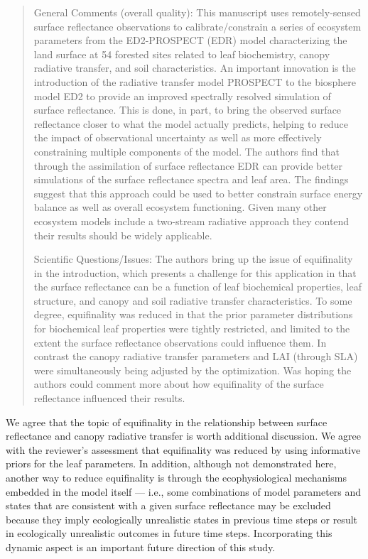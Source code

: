 \begin{quote}
  General Comments (overall quality): This manuscript uses remotely-sensed surface reflectance observations to calibrate/constrain a series of ecosystem parameters from the ED2-PROSPECT (EDR) model characterizing the land surface at 54 forested sites related to leaf biochemistry, canopy radiative transfer, and soil characteristics. An important innovation is the introduction of the radiative transfer model PROSPECT to the biosphere model ED2 to provide an improved spectrally resolved simulation of surface reflectance. This is done, in part, to bring the observed surface reflectance closer to what the model actually predicts, helping to reduce the impact of observational uncertainty as well as more effectively constraining multiple components of the model. The authors find that through the assimilation of surface reflectance EDR can provide better simulations of the surface reflectance spectra and leaf area. The findings suggest that this approach could be used to better constrain surface energy balance as well as overall ecosystem functioning. Given many other ecosystem models include a two-stream radiative approach they contend their results should be widely applicable.

  Scientific Questions/Issues: The authors bring up the issue of equifinality in the introduction, which presents a challenge for this application in that the surface reflectance can be a function of leaf biochemical properties, leaf structure, and canopy and soil radiative transfer characteristics. To some degree, equifinality was reduced in that the prior parameter distributions for biochemical leaf properties were tightly restricted, and limited to the extent the surface reflectance observations could influence them. In contrast the canopy radiative transfer parameters and LAI (through SLA) were simultaneously being adjusted by the optimization. Was hoping the authors could comment more about how equifinality of the surface reflectance influenced their results.
\end{quote}

We agree that the topic of equifinality in the relationship between surface reflectance and canopy radiative transfer is worth additional discussion. We agree with the reviewer's assessment that equifinality was reduced by using informative priors for the leaf parameters. In addition, although not demonstrated here, another way to reduce equifinality is through the ecophysiological mechanisms embedded in the model itself --- i.e., some combinations of model parameters and states that are consistent with a given surface reflectance may be excluded because they imply ecologically unrealistic states in previous time steps or result in ecologically unrealistic outcomes in future time steps. Incorporating this dynamic aspect is an important future direction of this study.

